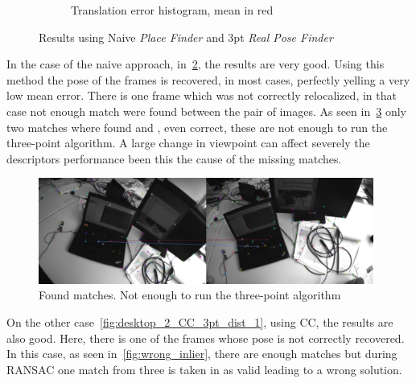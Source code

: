 \begin{figure}[htpb]
\begin{subfigure}[b]{6cm}
          \caption{Translation error histogram, mean in red} 
          \label{fig:desktop_2_naive_3pt_dist_1}
  \end{subfigure}
  \caption{Results using Naive \textit{Place Finder} and 3pt  \textit{Real Pose Finder}}
\end{figure}

In the case of the naive approach, in~\ref{fig:desktop_2_naive_3pt_dist_1}, the results are very good. Using this method the pose of the frames is recovered, in most cases, perfectly yelling a very low mean error. There is one frame which was not correctly relocalized, in that case not enough match were found between the pair of images. As seen in~\ref{fig:not_enough_matches} only two matches where found and , even correct, these are not enough to run the three-point algorithm. A large change in viewpoint can affect severely the descriptors performance been this the cause of the missing matches.\\

\begin{figure}[htpb]
  \centering
  \includegraphics[width=11cm]{img/not_enough_matches.png}
  \caption{Found matches. Not enough to run the three-point algorithm}
  \label{fig:not_enough_matches}
\end{figure}

On the other case~\ref{fig:desktop_2_CC_3pt_dist_1}, using CC, the results are also good. Here, there is one of the frames whose pose is not correctly recovered. In this case, as seen in~\ref{fig:wrong_inlier}, there are enough matches but during RANSAC one match from three is taken in as valid leading to a wrong solution.\\

